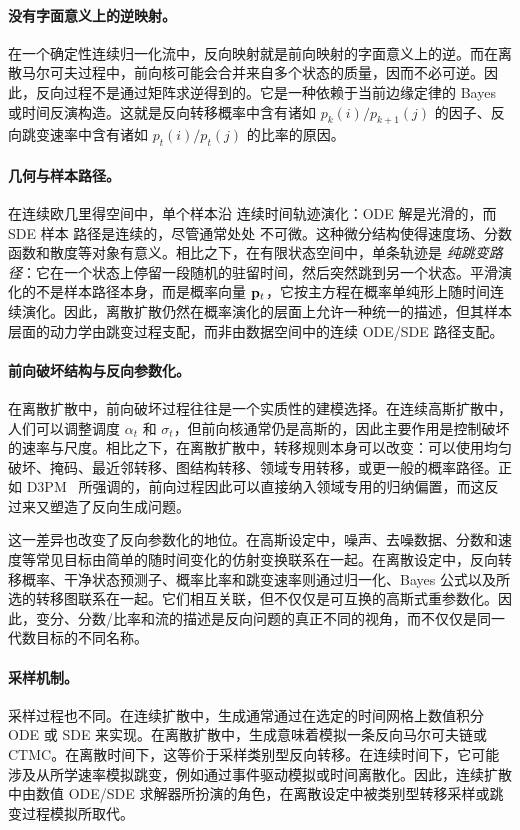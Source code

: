 \paragraph{没有字面意义上的逆映射。}
在一个确定性连续归一化流中，反向映射就是前向映射的字面意义上的逆。而在离散马尔可夫过程中，前向核可能会合并来自多个状态的质量，因而不必可逆。因此，反向过程不是通过矩阵求逆得到的。它是一种依赖于当前边缘定律的 Bayes 或时间反演构造。这就是反向转移概率中含有诸如 $p_k(i)/p_{k+1}(j)$ 的因子、反向跳变速率中含有诸如 $p_t(i)/p_t(j)$ 的比率的原因。

\paragraph{几何与样本路径。}
在连续欧几里得空间中，单个样本沿
连续时间轨迹演化：ODE 解是光滑的，而 SDE 样本
路径是连续的，尽管通常处处
不可微。这种微分结构使得速度场、分数函数和散度等对象有意义。相比之下，在有限状态空间中，单条轨迹是
\emph{纯跳变路径}：它在一个状态上停留一段随机的驻留时间，然后突然跳到另一个状态。平滑演化的不是样本路径本身，而是概率向量 ${\mathbf{p}}_t$，它按主方程在概率单纯形上随时间连续演化。因此，离散扩散仍然在概率演化的层面上允许一种统一的描述，但其样本层面的动力学由跳变过程支配，而非由数据空间中的连续 ODE/SDE 路径支配。

\paragraph{前向破坏结构与反向参数化。}
在离散扩散中，前向破坏过程往往是一个实质性的建模选择。在连续高斯扩散中，人们可以调整调度 $\alpha_t$ 和 $\sigma_t$，但前向核通常仍是高斯的，因此主要作用是控制破坏的速率与尺度。相比之下，在离散扩散中，转移规则本身可以改变：可以使用均匀破坏、掩码、最近邻转移、图结构转移、领域专用转移，或更一般的概率路径。正如 D3PM~\citep{austin2021structured} 所强调的，前向过程因此可以直接纳入领域专用的归纳偏置，而这反过来又塑造了反向生成问题。

这一差异也改变了反向参数化的地位。在高斯设定中，噪声、去噪数据、分数和速度等常见目标由简单的随时间变化的仿射变换联系在一起。在离散设定中，反向转移概率、干净状态预测子、概率比率和跳变速率则通过归一化、Bayes 公式以及所选的转移图联系在一起。它们相互关联，但不仅仅是可互换的高斯式重参数化。因此，变分、分数/比率和流的描述是反向问题的真正不同的视角，而不仅仅是同一代数目标的不同名称。

\paragraph{采样机制。}
采样过程也不同。在连续扩散中，生成通常通过在选定的时间网格上数值积分 ODE 或 SDE 来实现。在离散扩散中，生成意味着模拟一条反向马尔可夫链或 CTMC\@。在离散时间下，这等价于采样类别型反向转移。在连续时间下，它可能涉及从所学速率模拟跳变，例如通过事件驱动模拟或时间离散化。因此，连续扩散中由数值 ODE/SDE 求解器所扮演的角色，在离散设定中被类别型转移采样或跳变过程模拟所取代。

